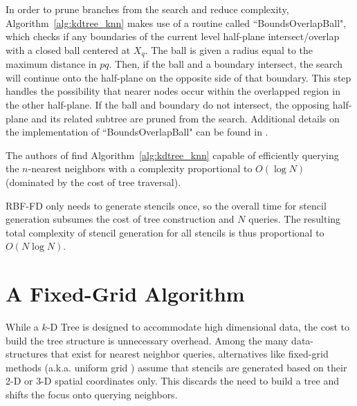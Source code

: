 \documentclass{report}
\begin{document}
In order to prune branches from the search and reduce complexity, Algorithm~\ref{alg:kdtree_knn} makes use of a routine called ``BoundsOverlapBall", which checks if any boundaries of the current level half-plane intersect/overlap with a closed ball centered at $X_q$. The ball is given a radius equal to the maximum distance in $pq$. Then, if the ball and a boundary intersect, the search will continue onto the half-plane on the opposite side of that boundary. This step handles the possibility that nearer nodes occur within the overlapped region in the other half-plane. If the ball and boundary do not intersect, the opposing half-plane and its related subtree are pruned from the search. Additional details on the implementation of ``BoundsOverlapBall" can be found in \cite{Friedman1977,TagliasacchiGC}. 

The authors of \cite{Friedman1977} find Algorithm~\ref{alg:kdtree_knn} capable of efficiently querying the $n$-nearest neighbors with a complexity proportional to $O(\log{N})$ (dominated by the cost of tree traversal). %

RBF-FD only needs to generate stencils once, so the overall time for stencil generation subsumes the cost of tree construction and $N$ queries. The resulting total complexity of stencil generation for all stencils is thus proportional to $O(N\log{N})$. %





\section{A Fixed-Grid Algorithm}

While a $k$-D Tree is designed to accommodate high dimensional data, the cost to build the tree structure is unnecessary overhead. Among the many data-structures that exist for nearest neighbor queries, alternatives like fixed-grid methods \cite{Samet2005,Wendland2002,WendlandBook} (a.k.a. uniform grid \cite{Krog2010,Green2010}) assume that stencils are generated based on their 2-D or 3-D spatial coordinates only. This discards the need to build a tree and shifts the focus onto querying neighbors.
\end{document}
